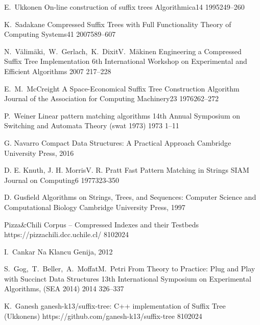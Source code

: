 \clanekVRevijiEnAvtor
    {E.~Ukkonen}
    {On-line construction of suffix trees}
    {Algorithmica}{14}
    {1995}{249--260}

\clanekVRevijiEnAvtor
    {K.~Sadakane}
    {Compressed Suffix Trees with Full Functionality}
    {Theory of Computing Systems}{41}
    {2007}{589--607}


\konferencniClanekVecAvtorjev
    {N.~V{\"a}lim{\"a}ki,~W.~Gerlach,~K.~Dixit}{V.~M{\"a}kinen}
    {Engineering a Compressed Suffix Tree Implementation}
    {6th International Workshop on Experimental and Efficient Algorithms}
    {2007}
    {217--228}

\clanekVRevijiEnAvtor
    {E.~M.~McCreight}
    {A Space-Economical Suffix Tree Construction Algorithm}
    {Journal of the Association for Computing Machinery}{23}
    {1976}{262--272}

\konferencniClanekEnAvtor
    {P.~Weiner}
    {Linear pattern matching algorithms}
    {14th Annual Symposium on Switching and Automata Theory (swat 1973)}
    {1973}
    {1--11}

\knjigaEnAvtor
    {G. Navarro}
    {Compact Data Structures: A Practical Approach}
    {Cambridge University Press, 2016}


\clanekVRevijiVecAvtorjev
    {D. E. Knuth, J. H. Morris}{V. R. Pratt}
    {Fast Pattern Matching in Strings}
    {SIAM Journal on Computing}{6}
    {1977}{323-350}

\knjigaEnAvtor
    {D. Gusfield}
    {Algorithms on Strings, Trees, and Sequences: Computer Science and Computational Biology}
    {Cambridge University Press, 1997}


\spletniVirBrezAvtorja
    {Pizza\&Chili Corpus -- Compressed Indexes and their Testbeds}
    {\newline https://pizzachili.dcc.uchile.cl/}
    {8}{10}{2024}


\knjigaEnAvtor
    {I.~Cankar}
    {Na Klancu}
    {Genija, 2012}

\konferencniClanekVecAvtorjev
    {S.~Gog,~T.~Beller,~A.~Moffat}{M.~Petri}
    {From Theory to Practice: Plug and Play with Succinct Data Structures}
    {13th International Symposium on Experimental Algorithms, (SEA 2014)}
    {2014}
    {326--337}

\spletniVirZAvtorjem
    {K.~Ganesh}
    {ganesh-k13/suffix-tree: C++ implementation of Suffix Tree (Ukkonens)}
    {https://github.com/ganesh-k13/suffix-tree}
    {8}{10}{2024}

